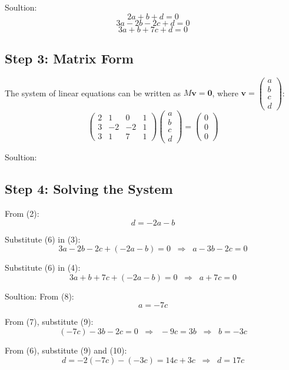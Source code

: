 \documentclass{beamer}
\begin{document}
\begin{frame}{Soultion:}
\[
2a + b + d = 0 \tag{2}
\]
\[
3a - 2b - 2c + d = 0 \tag{3}
\]
\[
3a + b + 7c + d = 0 \tag{4}
\]
\subsection*{Step 3: Matrix Form}
The system of linear equations can be written as $M \mathbf{v} = \mathbf{0}$, where $\mathbf{v} = \begin{pmatrix} a\\ b\\ c\\ d \end{pmatrix}$:
\[
\begin{pmatrix}
2 & 1 & 0 & 1\\
3 & -2 & -2 & 1\\
3 & 1 & 7 & 1
\end{pmatrix}
\begin{pmatrix} a\\ b\\ c\\ d \end{pmatrix}
=
\begin{pmatrix} 0\\0\\0 \end{pmatrix}
\tag{5}
\]
\end{frame}

\begin{frame}{Soultion:}
\subsection*{Step 4: Solving the System}
From (2):
\[
d = -2a - b \tag{6}
\]

Substitute (6) in (3):
\[
3a - 2b - 2c + (-2a - b) = 0 \;\;\Rightarrow\;\; a - 3b - 2c = 0 \tag{7}
\]

Substitute (6) in (4):
\[
3a + b + 7c + (-2a - b) = 0 \;\;\Rightarrow\;\; a + 7c = 0 \tag{8}
\]
\end{frame}

\begin{frame}{Soultion:}
From (8):
\[
a = -7c \tag{9}
\]

From (7), substitute (9):
\[
(-7c) - 3b - 2c = 0 \;\;\Rightarrow\;\; -9c = 3b \;\;\Rightarrow\;\; b = -3c \tag{10}
\]

From (6), substitute (9) and (10):
\[
d = -2(-7c) - (-3c) = 14c + 3c \;\;\Rightarrow\;\; d = 17c \tag{11}
\]
\end{frame}
\end{document}
